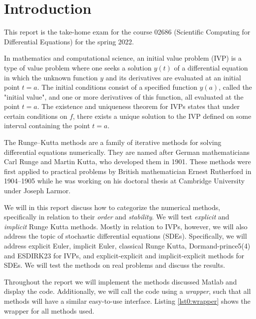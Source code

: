 \chapter*{Introduction}
This report is the take-home exam for the course 02686 (Scientific Computing for Differential Equations) for the spring 2022. 

In mathematics and computational science, an initial value problem (IVP) is a type of value problem where one seeks a solution $y(t)$ of a differential equation in which the unknown function $y$ and its derivatives are evaluated at an initial point $t=a$. The initial conditions consist of a specified function $y(a)$, called the "initial value", and one or more derivatives of this function, all evaluated at the point $t=a$. The existence and uniqueness theorem for IVPs states that under certain conditions on $f$, there exists a unique solution to the IVP defined on some interval containing the point $t=a$.

The Runge–Kutta methods are a family of iterative methods for solving differential equations numerically. They are named after German mathematicians Carl Runge and Martin Kutta, who developed them in 1901. These methods were first applied to practical problems by British mathematician Ernest Rutherford in 1904–1905 while he was working on his doctoral thesis at Cambridge University under Joseph Larmor.

We will in this report discuss how to categorize the numerical methods, specifically in relation to their \textit{order} and \textit{stability}. We will test \textit{explicit} and \textit{implicit} Runge Kutta methods. Mostly in relation to IVPs, however, we will also address the topic of stochastic differential equations (SDEs). Specifically, we will address explicit Euler, implicit Euler, classical Runge Kutta, Dormand-prince5(4) and ESDIRK23 for IVPs, and explicit-explicit and implicit-explicit methods for SDEs. We will test the methods on real problems and discuss the results. 

Throughout the report we will implement the methods discussed Matlab and display the code. Additionally, we will call the code using a \textit{wrapper}, such that all methods will have a similar easy-to-use interface. Listing \ref{lst0:wrapper} shows the wrapper for all methods used. 

